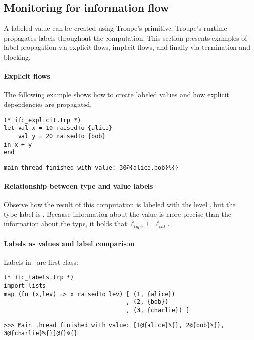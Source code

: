 \subsection{Monitoring for information flow}
A labeled value can be created using Troupe's 
primitive. Troupe's runtime propagates labels throughout the computation.
This section presents examples of label propagation via explicit flows, implicit flows, and
finally via termination and blocking.


\paragraph{Explicit flows}
The following example shows how to create labeled values and how explicit dependencies are propagated.
\begin{lstlisting}
(* ifc_explicit.trp *)
let val x = 10 raisedTo {alice}
    val y = 20 raisedTo {bob}
in x + y
end
\end{lstlisting}
\begin{verbatim}
main thread finished with value: 30@{alice,bob}%{}
\end{verbatim}



\paragraph{Relationship between type and value labels}
Observe how the result of this computation is labeled with 
the level , but the type label is \lev{}.
Because information about the value is more precise than the information about the type, it holds that 
$\ell_{\mathit{type}} \sqsubseteq \ell_{\mathit{val}}$. 



\paragraph{Labels as values and label comparison}
Labels in \troupelang\ are first-class:

\begin{lstlisting}
(* ifc_labels.trp *)
import lists
map (fn (x,lev) => x raisedTo lev) [ (1, {alice})
                                   , (2, {bob})
                                   , (3, {charlie}) ]
\end{lstlisting}
\begin{lstlisting}
>>> Main thread finished with value: [1@{alice}%{}, 2@{bob}%{}, 
3@{charlie}%{}]@{}%{}    
\end{lstlisting}
